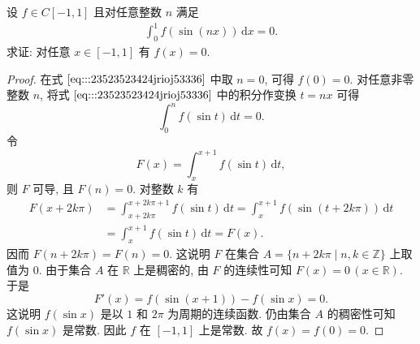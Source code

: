 \documentclass[../../main.tex]{subfiles}%
\begin{document}
\begin{example}
设 \( f \in C[-1,1] \) 且对任意整数 \( n \) 满足  
\begin{align}
\int_{0}^{1} f(\sin(nx)) \, \mathrm{d}x = 0. \label{eq:::23523523424jrioj53336}
\end{align}  
求证: 对任意 \( x \in [-1,1] \) 有 \( f(x) = 0 \).  
\end{example}
\begin{proof}
在式 \(\eqref{eq:::23523523424jrioj53336}\) 中取 \( n = 0 \), 可得 \( f(0) = 0 \). 对任意非零整数 \( n \), 将式 \(\eqref{eq:::23523523424jrioj53336}\) 中的积分作变换 \( t = nx \) 可得  
\[
\int_{0}^{n} f(\sin t) \, \mathrm{d}t = 0.
\]  
令 
\[
F(x) = \int_{x}^{x + 1} f(\sin t) \, \mathrm{d}t,
\]  
则 \( F \) 可导, 且 \( F(n) = 0 \). 对整数 \( k \) 有  
\[
\begin{aligned}
F(x + 2k\pi) &= \int_{x + 2k\pi}^{x + 2k\pi + 1} f(\sin t) \, \mathrm{d}t = \int_{x}^{x + 1} f(\sin(t + 2k\pi)) \, \mathrm{d}t \\
&= \int_{x}^{x + 1} f(\sin t) \, \mathrm{d}t = F(x).
\end{aligned}
\]  
因而 \( F(n + 2k\pi) = F(n) = 0 \). 这说明 \( F \) 在集合 \( A = \{ n + 2k\pi \mid n, k \in \mathbb{Z} \} \) 上取值为 \( 0 \). 由于集合 \( A \) 在 \( \mathbb{R} \) 上是稠密的, 由 \( F \) 的连续性可知 \( F(x) = 0 \, (x \in \mathbb{R}) \). 于是  
\[
F'(x) = f(\sin(x + 1)) - f(\sin x) = 0.
\]  
这说明 \( f(\sin x) \) 是以 \( 1 \) 和 \( 2\pi \) 为周期的连续函数. 仍由集合 \( A \) 的稠密性可知 \( f(\sin x) \) 是常数. 因此 \( f \) 在 \( [-1,1] \) 上是常数. 故 \( f(x) = f(0) = 0 \).
\end{proof}
\end{document}
